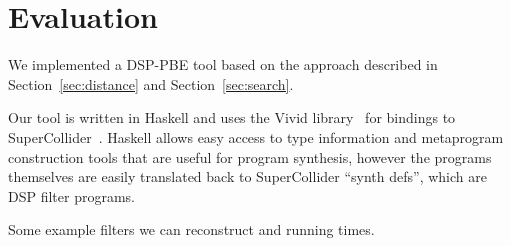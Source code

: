 \section{Evaluation}

We implemented a DSP-PBE tool based on the approach described in Section~\ref{sec:distance} and Section~\ref{sec:search}.

Our tool is written in Haskell and uses the Vivid library~\cite{vivid} for bindings to SuperCollider~\cite{supercollider}.
Haskell allows easy access to type information and metaprogram construction tools that are useful for program synthesis, however the programs themselves are easily translated back to SuperCollider ``synth defs'', which are DSP filter programs.

Some example filters we can reconstruct and running times.

